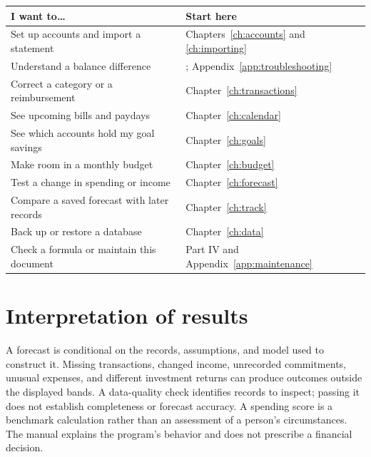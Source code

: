 \begin{tabularx}{\textwidth}{@{}YY@{}}
\toprule
I want to\ldots & Start here\\\midrule
Set up accounts and import a statement & Chapters~\ref{ch:accounts} and \ref{ch:importing}\\
Understand a balance difference & ; Appendix~\ref{app:troubleshooting}\\
Correct a category or a reimbursement & Chapter~\ref{ch:transactions}\\
See upcoming bills and paydays & Chapter~\ref{ch:calendar}\\
See which accounts hold my goal savings & Chapter~\ref{ch:goals}\\
Make room in a monthly budget & Chapter~\ref{ch:budget}\\
Test a change in spending or income & Chapter~\ref{ch:forecast}\\
Compare a saved forecast with later records & Chapter~\ref{ch:track}\\
Back up or restore a database & Chapter~\ref{ch:data}\\
Check a formula or maintain this document & Part IV and Appendix~\ref{app:maintenance}\\
\bottomrule
\end{tabularx}

\section*{Interpretation of results}
A forecast is conditional on the records, assumptions, and model used to construct it. Missing transactions, changed income, unrecorded commitments, unusual expenses, and different investment returns can produce outcomes outside the displayed bands. A data-quality check identifies records to inspect; passing it does not establish completeness or forecast accuracy. A spending score is a benchmark calculation rather than an assessment of a person's circumstances. The manual explains the program's behavior and does not prescribe a financial decision.

